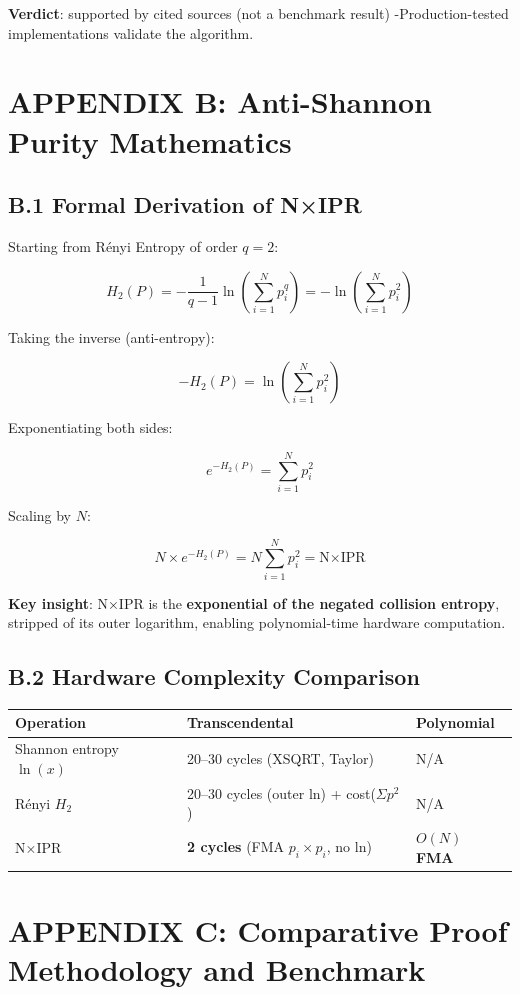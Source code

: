 \documentclass[11pt,oneside]{article}
\begin{document}
\textbf{Verdict}: supported by cited sources (not a benchmark result) -Production-tested implementations validate the algorithm.

\section{APPENDIX B: Anti-Shannon Purity Mathematics}

\subsection{B.1 Formal Derivation of N×IPR}

Starting from Rényi Entropy of order $q=2$:

\[H_2(P) = -\frac{1}{q-1} \ln \left( \sum_{i=1}^{N} p_i^q \right) = -\ln \left( \sum_{i=1}^{N} p_i^2 \right)\]

Taking the inverse (anti-entropy):

\[-H_2(P) = \ln \left( \sum_{i=1}^{N} p_i^2 \right)\]

Exponentiating both sides:

\[e^{-H_2(P)} = \sum_{i=1}^{N} p_i^2\]

Scaling by $N$:

\[N \times e^{-H_2(P)} = N \sum_{i=1}^{N} p_i^2 = \text{N×IPR}\]

\textbf{Key insight}: N×IPR is the \textbf{exponential of the negated collision entropy}, stripped of its outer logarithm, enabling polynomial-time hardware computation.

\subsection{B.2 Hardware Complexity Comparison}

\begin{center}
\begin{tabular}{lll}
\toprule
Operation & Transcendental & Polynomial \\
\midrule
Shannon entropy $\ln(x)$ & 20--30 cycles (XSQRT, Taylor) & N/A \\
Rényi $H_2$ & 20--30 cycles (outer ln) + cost($\Sigma p^2$) & N/A \\
N×IPR & \textbf{2 cycles} (FMA $p_i \times p_i$, no ln) & \textbf{$O(N)$ FMA} \\
\bottomrule
\end{tabular}
\end{center}

\section{APPENDIX C: Comparative Proof Methodology and Benchmark}
\end{document}
